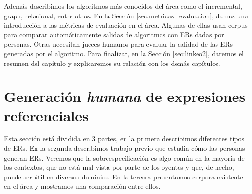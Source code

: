 Adem\'as describimos  los algoritmos m\'as conocidos del \'area como el incremental, graph, relacional, entre otros. 
En la Secci\'on \ref{sec:metricas_evaluacion}, damos una introducci\'on a las m\'etricas de evaluaci\'on en el \'area. Algunas de ellas usan corpus para comparar autom\'aticamente salidas de algoritmos con ERs dadas por personas. Otras necesitan jueces humanos para evaluar la calidad de las ERs generadas por el algoritmo. Para finalizar, en la Secci\'on \ref{sec:linkeo2}, daremos el resumen del cap\'itulo y explicaremos su relaci\'on con los dem\'as cap\'itulos.


\section{Generaci\'on \emph{humana} de expresiones referenciales}
\label{generacion-humana}

Esta secci\'on est\'a dividida en 3 partes, en la primera describimos diferentes tipos de ERs. En la segunda describimos trabajo previo que estudia c\'omo las personas generan ERs. Veremos que la sobreespecificaci\'on es algo com\'un en la mayor\'ia de los contextos, que no est\'a mal vista por parte de los oyentes y que, de hecho, puede ser \'util en diversos dominios. En la tercera presentamos corpora existente en el \'area y mostramos una comparaci\'on entre ellos.


